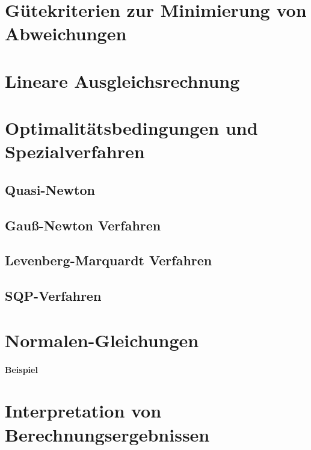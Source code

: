 	\section{Gütekriterien zur Minimierung von Abweichungen} %

	\section{Lineare Ausgleichsrechnung} %

	\section{Optimalitätsbedingungen und Spezialverfahren} %

		\subsection{Quasi-Newton} %

		\subsection{Gauß-Newton Verfahren} %

		\subsection{Levenberg-Marquardt Verfahren} %

		\subsection{SQP-Verfahren} %

	\section{Normalen-Gleichungen} %

		\paragraph{Beispiel} %

	\section{Interpretation von Berechnungsergebnissen} %

